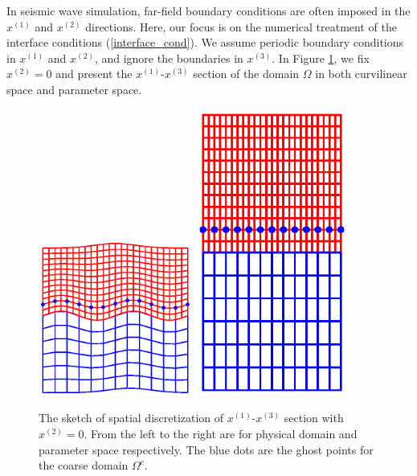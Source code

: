 In seismic wave simulation, far-field boundary conditions are often imposed in the $x^{(1)}$ and $x^{(2)}$ directions. Here, our focus is on the numerical treatment of the interface conditions (\ref{interface_cond}). We assume periodic boundary conditions in $x^{(1)}$ and $x^{(2)}$, and ignore the boundaries in $x^{(3)}$. In Figure \ref{section_discretization}, we fix $x^{(2)} = 0$ and present the $x^{(1)}$-$x^{(3)}$ section of the domain $\Omega$ in both curvilinear space and parameter space.
\begin{figure}[htbp]
	\centering
	\includegraphics[width=0.45\textwidth,trim={1.0cm 2.0cm 1.0cm 1.8cm}, clip]{physical_section_discretization.eps}
	\includegraphics[width=0.45\textwidth,trim={1.0cm 2.0cm 1cm 1.8cm}, clip]{parameter_section_discretization.eps}
	\caption{The sketch of spatial discretization of $x^{(1)}$-$x^{(3)}$ section with $x^{(2)} = 0$. From the left to the right are for physical domain and parameter space respectively. The blue dots are the ghost points for the coarse domain $\Omega^c$.}\label{section_discretization}
\end{figure}
